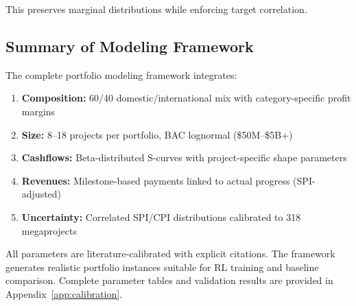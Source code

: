 This preserves marginal distributions while enforcing target correlation.

\subsection{Summary of Modeling Framework}

The complete portfolio modeling framework integrates:

\begin{enumerate}
    \item \textbf{Composition:} 60/40 domestic/international mix with category-specific profit margins
    \item \textbf{Size:} 8--18 projects per portfolio, BAC lognormal (\$50M--\$5B+)
    \item \textbf{Cashflows:} Beta-distributed S-curves with project-specific shape parameters
    \item \textbf{Revenues:} Milestone-based payments linked to actual progress (SPI-adjusted)
    \item \textbf{Uncertainty:} Correlated SPI/CPI distributions calibrated to 318 megaprojects
\end{enumerate}

All parameters are literature-calibrated with explicit citations. The framework generates realistic portfolio instances suitable for RL training and baseline comparison. Complete parameter tables and validation results are provided in Appendix~\ref{app:calibration}.
